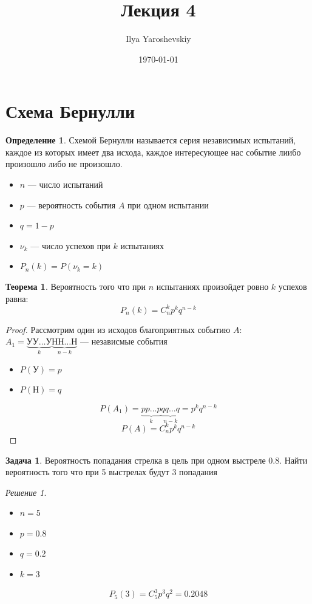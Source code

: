 \documentclass[english]{article}
\author{Ilya Yaroshevskiy}
\date{\today}
\title{Лекция 4}
\theoremstyle{plain}
\theoremstyle{remark}
\newtheorem*{solution}{Решение}
\theoremstyle{definition}
\newtheorem{task}{Задача}
\newtheorem{theorem}{Теорема}[section]
\newtheorem*{definition}{Определение}
\begin{document}
\maketitle
\tableofcontents


\section{Схема Бернулли}
\label{sec:orgabc06bf}
\begin{definition}
Схемой Бернулли называется серия независимых испытаний, каждое из
которых имеет два исхода, каждое интересующее нас событие лиибо
произошло либо не произошло.
\begin{itemize}
\item \(n\) --- число испытаний
\item \(p\) --- вероятность события \(A\) при одном испытании
\item \(q = 1 - p\)
\item \(\nu_k\) --- число успехов при \(k\) испытаниях
\item \(P_n(k) = P(\nu_k = k)\)
\end{itemize}
\end{definition}
\begin{theorem}
Вероятность того что при \(n\) испытаниях произойдет ровно \(k\) успехов равна:
\[ P_n(k) = C^k_np^kq^{n - k} \]
\end{theorem}
\begin{proof}
Рассмотрим один из исходов благоприятных событию \(A\): \(A_1 = \underbrace{\text{УУ}\dots\text{У}}_k\underbrace{\text{НН}\dots\text{Н}}_{n - k}\) --- независмые события \\
\begin{itemize}
\item \(P(\text{У}) = p\)
\item \(P(\text{Н}) = q\)
\end{itemize}
\[ P(A_1) = \underbrace{pp\dots p}_k\underbrace{qq\dots q}_{n - k} = p^kq^{n - k} \]
\[ P(A) = C^k_np^kq^{n - k} \]
\end{proof}
\begin{task}
Вероятность попадания стрелка в цель при одном выстреле 0.8. Найти
вероятность того что при 5 выстрелах будут 3 попадания
\end{task}
\begin{solution}
\-
\begin{itemize}
\item \(n = 5\)
\item \(p = 0.8\)
\item \(q = 0.2\)
\item \(k = 3\)
\end{itemize}
\[ P_5(3) = C^3_5 p^3q^2 = 0.2048\]
\end{solution}
\end{document}
